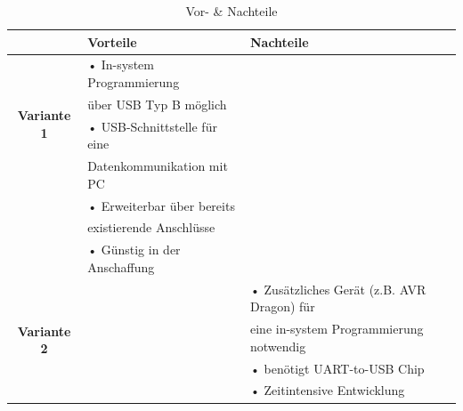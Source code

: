 \begin{table}[h]
  \centering
  \label{tab:mcu}
  \small
  \caption{Vor- \& Nachteile}
    \begin{tabular}{c|l|l}
          & \textbf{Vorteile} & \textbf{Nachteile} \\
    \toprule
    \multirow{4}[2]{*}{\textbf{Variante 1}} & • In-system Programmierung &  \\
          & \hspace{0.3cm} über USB Typ B möglich &  \\
          & • USB-Schnittstelle für eine &  \\
          &   \hspace{0.3cm} Datenkommunikation mit PC &  \\
          & • Erweiterbar über bereits  &  \\
          &   \hspace{0.3cm} existierende Anschlüsse &  \\
          & • Günstig in der Anschaffung  &  \\
    \hline
    \multirow{4}[1]{*}{\textbf{Variante 2}} &       & • Zusätzliches Gerät (z.B. AVR Dragon) für \\
          &       & \hspace{0.3cm} eine in-system Programmierung notwendig \\
          &       & • benötigt UART-to-USB Chip \\
          &       & • Zeitintensive Entwicklung\\
    \end{tabular}%
  \label{tab:mcu}%
\end{table}%

\newpage

